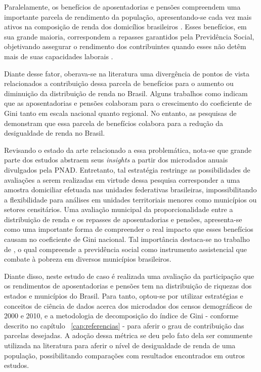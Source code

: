 Paralelamente, os benefícios de aposentadorias e pensões compreendem uma importante parcela de rendimento da população, apresentando-se cada vez mais ativos na composição de renda dos domicílios brasileiros \cite{cap02_ref22, cap04_ref5}. Esses benefícios, em sua grande maioria, correspondem a repasses garantidos pela Previdência Social, objetivando assegurar o rendimento dos contribuintes quando esses não detêm mais de suas capacidades laborais \cite{cap04_ref6}.

Diante desse fator, oberava-se na literatura uma divergência de pontos de vista relacionados a contribuição dessa parcela de benefícios para o aumento ou diminuição da distribuição de renda no Brasil. Alguns trabalhos como \cite{cap04_ref7, cap04_ref8, cap04_ref9} indicam que as aposentadorias e pensões colaboram para o crescimento do coeficiente de Gini tanto em escala nacional quanto regional. No entanto, as pesquisas de \cite{cap04_ref10, cap04_ref11} demonstram que essa parcela de benefícios colabora para a redução da desigualdade de renda no Brasil.

Revisando o estado da arte relacionado a essa problemática, nota-se que grande parte dos estudos abstraem seus \textit{insights} a partir dos microdados anuais divulgados pela PNAD. Entretanto, tal estratégia restringe as possibilidades de avaliações a serem realizadas em virtude dessa pesquisa corresponder a uma amostra domiciliar efetuada nas unidades federativas brasileiras, impossibilitando a flexibilidade para análises em unidades territoriais menores como municípios ou setores censitários. Uma avaliação municipal da proporcionalidade entre a distribuição de renda e os repasses de aposentadorias e pensões, apresenta-se como uma importante forma de compreender o real impacto que esses benefícios causam no coeficiente de Gini nacional. Tal importância destaca-se no trabalho de \cite{cap04_ref12}, o qual compreende a previdência social como instrumento assistencial que combate à pobreza em diversos municípios brasileiros.

Diante disso, neste estudo de caso é realizada uma avaliação da participação que os rendimentos de aposentadorias e pensões tem na distribuição de riquezas dos estados e municípios do Brasil. Para tanto, optou-se por utilizar estratégias e conceitos de ciência de dados acerca dos microdados dos censos demográficos de 2000 e 2010, e a metodologia de decomposição do índice de Gini - conforme descrito no capítulo ~\ref{cap:referencias} - para aferir o grau de contribuição das parcelas desejadas. A adoção dessa métrica se deu pelo fato dela ser comumente utilizada na literatura para aferir o nível de desigualdade de renda de uma população, possibilitando comparações com resultados encontrados em outros estudos.

